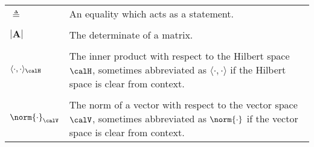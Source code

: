 \begin{longtable}{lp{}}
    $\triangleq$                                                                                               & An equality which acts as a statement.                                                                                                                                                                                                                                                                                                                                                                                                                                                                                                                                                                                                                                                                                                                                                                                                                                                                                                     \\\\
    $\left| \bm{A} \right|$                                                                                    & The determinate of a matrix.                                                                                                                                                                                                                                                                                                                                                                                                                                                                                                                                                                                                                                                                                                                                                                                                                                                                                                               \\\\
    $\langle \cdot , \cdot \rangle_{\calH}$                                                                    & The inner product with respect to the Hilbert space $\calH$, sometimes abbreviated as $\langle \cdot , \cdot \rangle$ if the Hilbert space is clear from context.
    \\\\
    $\norm{\cdot}_{\calV}$                                                                                     & The norm of a vector with respect to the vector space $\calV$, sometimes abbreviated as $\norm{\cdot}$ if the vector space is clear from context.

\end{longtable}
